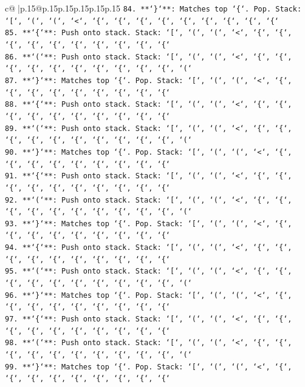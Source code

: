 \documentclass{article}
\begin{document}
{\begin{supertabular}{c@{$\;$}|p{.15\linewidth}@{}p{.15\linewidth}p{.15\linewidth}p{.15\linewidth}p{.15\linewidth}p{.15\linewidth}}
{{{\texttt{84. **`\}`**: Matches top `\{`. Pop. Stack: `{[}`, `(`, `(`, `<`, `\{`, `\{`, `\{`, `\{`, `\{`, `\{`, `\{`, `\{`, `\{`} \\
\texttt{85. **`\{`**: Push onto stack. Stack: `{[}`, `(`, `(`, `<`, `\{`, `\{`, `\{`, `\{`, `\{`, `\{`, `\{`, `\{`, `\{`, `\{`} \\
\texttt{86. **`(`**: Push onto stack. Stack: `{[}`, `(`, `(`, `<`, `\{`, `\{`, `\{`, `\{`, `\{`, `\{`, `\{`, `\{`, `\{`, `\{`, `(`} \\
\texttt{87. **`\}`**: Matches top `\{`. Pop. Stack: `{[}`, `(`, `(`, `<`, `\{`, `\{`, `\{`, `\{`, `\{`, `\{`, `\{`, `\{`, `\{`} \\
\texttt{88. **`\{`**: Push onto stack. Stack: `{[}`, `(`, `(`, `<`, `\{`, `\{`, `\{`, `\{`, `\{`, `\{`, `\{`, `\{`, `\{`, `\{`} \\
\texttt{89. **`(`**: Push onto stack. Stack: `{[}`, `(`, `(`, `<`, `\{`, `\{`, `\{`, `\{`, `\{`, `\{`, `\{`, `\{`, `\{`, `\{`, `(`} \\
\texttt{90. **`\}`**: Matches top `\{`. Pop. Stack: `{[}`, `(`, `(`, `<`, `\{`, `\{`, `\{`, `\{`, `\{`, `\{`, `\{`, `\{`, `\{`} \\
\texttt{91. **`\{`**: Push onto stack. Stack: `{[}`, `(`, `(`, `<`, `\{`, `\{`, `\{`, `\{`, `\{`, `\{`, `\{`, `\{`, `\{`, `\{`} \\
\texttt{92. **`(`**: Push onto stack. Stack: `{[}`, `(`, `(`, `<`, `\{`, `\{`, `\{`, `\{`, `\{`, `\{`, `\{`, `\{`, `\{`, `\{`, `(`} \\
\texttt{93. **`\}`**: Matches top `\{`. Pop. Stack: `{[}`, `(`, `(`, `<`, `\{`, `\{`, `\{`, `\{`, `\{`, `\{`, `\{`, `\{`, `\{`} \\
\texttt{94. **`\{`**: Push onto stack. Stack: `{[}`, `(`, `(`, `<`, `\{`, `\{`, `\{`, `\{`, `\{`, `\{`, `\{`, `\{`, `\{`, `\{`} \\
\texttt{95. **`(`**: Push onto stack. Stack: `{[}`, `(`, `(`, `<`, `\{`, `\{`, `\{`, `\{`, `\{`, `\{`, `\{`, `\{`, `\{`, `\{`, `(`} \\
\texttt{96. **`\}`**: Matches top `\{`. Pop. Stack: `{[}`, `(`, `(`, `<`, `\{`, `\{`, `\{`, `\{`, `\{`, `\{`, `\{`, `\{`, `\{`} \\
\texttt{97. **`\{`**: Push onto stack. Stack: `{[}`, `(`, `(`, `<`, `\{`, `\{`, `\{`, `\{`, `\{`, `\{`, `\{`, `\{`, `\{`, `\{`} \\
\texttt{98. **`(`**: Push onto stack. Stack: `{[}`, `(`, `(`, `<`, `\{`, `\{`, `\{`, `\{`, `\{`, `\{`, `\{`, `\{`, `\{`, `\{`, `(`} \\
\texttt{99. **`\}`**: Matches top `\{`. Pop. Stack: `{[}`, `(`, `(`, `<`, `\{`, `\{`, `\{`, `\{`, `\{`, `\{`, `\{`, `\{`, `\{`} \\
}}}
\end{supertabular}}
\end{document}
